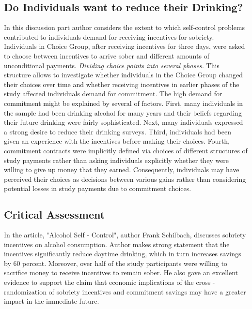 \documentclass[a4paper,12pt]{article}
\begin{document}
\subsection{Do Individuals want to reduce their Drinking?}
In this discussion part author considers the extent to which self-control problems contributed to individuals demand for receiving incentives for sobriety. Individuals in Choice Group, after receiving incentives for three days, were asked to choose between incentives to arrive sober and different amounts of unconditional payments. \textit{Dividing choice points into several phases.} This structure allows to investigate whether individuals in the Choice Group changed their choices over time and whether receiving incentives in earlier phases of the study affected individuals demand for commitment. The high demand for commitment might be explained by several of factors. First, many individuals in the sample had been drinking alcohol for many years and their beliefs regarding their future drinking were fairly sophisticated. Next, many individuals expressed a strong desire to reduce their drinking surveys. Third, individuals had been given an experience with the incentives before making their choices. Fourth, commitment contracts were implicitly defined via choices of different structures of study payments rather than asking individuals explicitly whether they were willing to give up money that they earned. Consequently, individuals may have perceived their choices as decisions between various gains rather than considering potential losses in study payments due to commitment choices. 

\subsection{Critical Assessment}
In the article, "Alcohol Self - Control", author Frank Schilbach, discusses sobriety incentives on alcohol consumption. Author makes strong statement that the incentives significantly reduce daytime drinking, which in turn increases savings by 60 percent. Moreover, over half of the study participants were willing to sacrifice money to receive incentives to remain sober. He also gave an excellent evidence to support the claim that economic implications of the cross - randomization of sobriety incentives and commitment savings may have a greater impact in the immediate future.  
\end{document}
